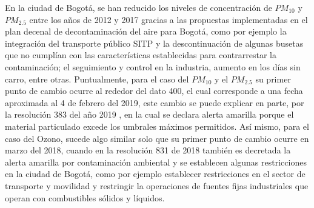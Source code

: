 En la ciudad de Bogotá, se han reducido los niveles de concentración de $PM_{10}$ y $PM_{2.5}$ entre los años de 2012 y 2017 gracias a las propuestas implementadas en el plan decenal de decontaminación del aire para Bogotá, como por ejemplo la integración del transporte público SITP y la descontinuación de algunas busetas que no cumplían con las características establecidas para contrarrestar la contaminación; el seguimiento y control en la industria, aumento en los días sin carro, entre otras.
Puntualmente, para el caso del $PM_{10}$ y el $PM_{2.5}$ su primer punto de cambio ocurre al rededor del dato 400, el cual corresponde a una fecha aproximada al 4 de febrero del 2019, este cambio se puede explicar en parte, por la resolución 383 del año 2019 \cite{res2019}, en la cual se declara alerta amarilla porque el material particulado excede los umbrales máximos permitidos. Así mismo, para el caso del Ozono, sucede algo similar solo que su primer punto de cambio ocurre en marzo del 2018, cuando en la resolución 831 de 2018 \cite{res2018} también es decretada la alerta amarilla por contaminación ambiental y se establecen algunas restricciones en la ciudad de Bogotá, como por ejemplo establecer  restricciones en el sector de transporte y movilidad y restringir la operaciones de fuentes fijas industriales que operan con combustibles sólidos y líquidos. 

 
